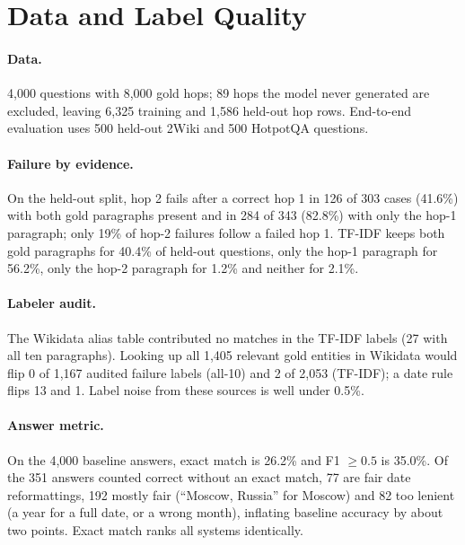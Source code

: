 \documentclass[11pt]{article}
\begin{document}



\appendix

\section{Data and Label Quality}
\label{app:labels}

\paragraph{Data.} 4,000 questions with 8,000 gold hops; 89 hops the model never generated are excluded, leaving 6,325 training and 1,586 held-out hop rows. End-to-end evaluation uses 500 held-out 2Wiki and 500 HotpotQA questions.

\paragraph{Failure by evidence.} On the held-out split, hop 2 fails after a correct hop 1 in 126 of 303 cases (41.6\%) with both gold paragraphs present and in 284 of 343 (82.8\%) with only the hop-1 paragraph; only 19\% of hop-2 failures follow a failed hop 1. TF-IDF keeps both gold paragraphs for 40.4\% of held-out questions, only the hop-1 paragraph for 56.2\%, only the hop-2 paragraph for 1.2\% and neither for 2.1\%.

\paragraph{Labeler audit.} The Wikidata alias table contributed no matches in the TF-IDF labels (27 with all ten paragraphs). Looking up all 1,405 relevant gold entities in Wikidata would flip 0 of 1,167 audited failure labels (all-10) and 2 of 2,053 (TF-IDF); a date rule flips 13 and 1. Label noise from these sources is well under 0.5\%.

\paragraph{Answer metric.} On the 4,000 baseline answers, exact match is 26.2\% and F1 $\geq 0.5$ is 35.0\%. Of the 351 answers counted correct without an exact match, 77 are fair date reformattings, 192 mostly fair (``Moscow, Russia'' for Moscow) and 82 too lenient (a year for a full date, or a wrong month), inflating baseline accuracy by about two points. Exact match ranks all systems identically.
\end{document}
